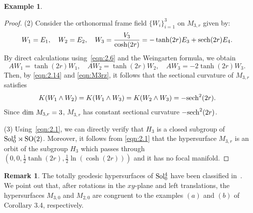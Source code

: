 \documentclass[reqno]{amsart}%
\theoremstyle{definition}
\newtheorem{example}{Example}[section]  %
\newtheorem{remark}{Remark}[section]
\numberwithin{equation}{section}
\begin{document}
\begin{example}
\begin{proof}
			(2) Consider the orthonormal frame field $\{W_i\}_{i=1}^3$ on $M_{3,r}$ given by:
			$$
			W_1=E_1,
			\quad W_2=E_2, \quad
			W_3=\frac{V_3}{\cosh(2r)}=-\tanh (2r)E_3+{\rm sech}(2r)E_4.
			$$
			By direct calculations using~\eqref{eqn:2.6} and the Weingarten formula, we obtain
			\begin{equation}\label{eqn:M3rz}
				AW_1=\tanh(2r)W_1, \quad AW_2=\tanh(2r)W_2, \quad AW_3=-2\tanh(2r)W_3.
			\end{equation}
			Then, by \eqref{eqn:2.14} and \eqref{eqn:M3rz}, it follows that the sectional curvature of $M_{3,r}$ satisfies
			\begin{equation}\label{eqn:M3rsec}
				K(W_1\wedge W_2)=K(W_1\wedge W_3)=K(W_2\wedge W_3)=-{\rm sech}^2 (2r).
			\end{equation}
			Since ${\rm dim}\ M_{3,r}=3$, $M_{3,r}$ has constant sectional curvature $-{\rm sech}^2 (2r)$. 
			
			
			(3) Using~\eqref{eqn:2.1},
			we can directly verify that $H_3$ is a closed subgroup of
			${\rm Sol_0^4 \rtimes SO(2)}$. Moreover, it follows from \eqref{eqn:2.1} that
			the hypersurface $M_{3,r}$ is an orbit of the subgroup $H_3$
			which passes through $(0,0,\tfrac{1}{2}\tanh(2r),\tfrac{1}{2}\ln(\cosh(2r)))$ and
			it has no focal manifold.
		\end{proof}
	\end{example}
	
	\begin{remark}\label{rm:1.3}
		The totally geodesic hypersurfaces of ${\rm Sol_0^4}$ have
		been classified in~\cite[Cor.3.4]{DIV}.
		We point out that, after rotations in the $xy$-plane and left translations,
		the hypersurfaces $M_{3,0}$ and $M_{2,0}$ are congruent to the examples $(a)$ and $(b)$
		of Corollary 3.4, respectively.
	\end{remark}
	
\end{document}
